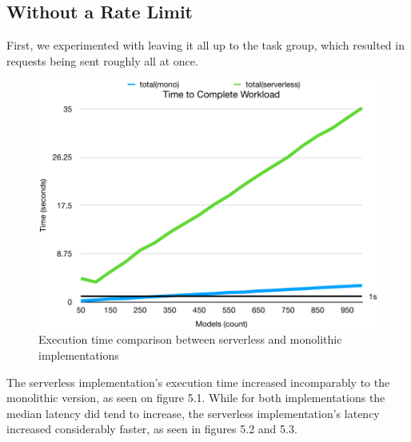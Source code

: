 \subsection{Without a Rate Limit}
First, we experimented with leaving it all up to the task group, which resulted in requests being sent roughly all at once. 
\begin{figure}[h!]
    \centering
    \includegraphics[width=\textwidth]{media/no_rl_ex.pdf}
    \caption{Execution time comparison between serverless and monolithic implementations}
    \label{fig:rate_unlimited_comparison}
\end{figure}
The serverless implementation's execution time increased incomparably to the monolithic version, as seen on figure 5.1.
While for both implementations the median latency did tend to increase, the serverless implementation's latency increased considerably faster, as seen in figures 5.2 and 5.3.
